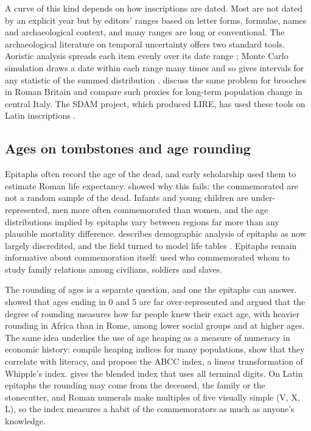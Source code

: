 A curve of this kind depends on how inscriptions are dated. Most are not dated by an explicit year but by editors' ranges based on letter forms, formulae, names and archaeological context, and many ranges are long or conventional. The archaeological literature on temporal uncertainty offers two standard tools. Aoristic analysis spreads each item evenly over its date range \citep{ratcliffe2000,johnson2004}; Monte Carlo simulation draws a date within each range many times and so gives intervals for any statistic of the summed distribution \citep{crema2012}. \citet{baxtercool2016} discuss the same problem for brooches in Roman Britain and \citet{palmisano2017} compare such proxies for long-term population change in central Italy. The SDAM project, which produced LIRE, has used these tools on Latin inscriptions \citep{hermankova2021,kase2022division}.

\subsection{Ages on tombstones and age rounding}
Epitaphs often record the age of the dead, and early scholarship used them to estimate Roman life expectancy. \citet{hopkins1966} showed why this fails: the commemorated are not a random sample of the dead. Infants and young children are under-represented, men more often commemorated than women, and the age distributions implied by epitaphs vary between regions far more than any plausible mortality difference. \citet{scheidel2001} describes demographic analysis of epitaphs as now largely discredited, and the field turned to model life tables \citep{frier1982,frier1983,parkin1992,scheidel1996}. Epitaphs remain informative about commemoration itself: \citet{sallershaw1984} used who commemorated whom to study family relations among civilians, soldiers and slaves.

The rounding of ages is a separate question, and one the epitaphs can answer. \citet{duncanjones1977} showed that ages ending in 0 and 5 are far over-represented and argued that the degree of rounding measures how far people knew their exact age, with heavier rounding in Africa than in Rome, among lower social groups and at higher ages. The same idea underlies the use of age heaping as a measure of numeracy in economic history: \citet{ahearn2009} compile heaping indices for many populations, show that they correlate with literacy, and propose the ABCC index, a linear transformation of Whipple's index. \citet{myers1940} gives the blended index that uses all terminal digits. On Latin epitaphs the rounding may come from the deceased, the family or the stonecutter, and Roman numerals make multiples of five visually simple (V, X, L), so the index measures a habit of the commemorators as much as anyone's knowledge.

